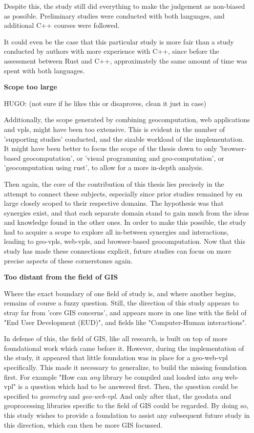 Despite this, the study still did everything to make the judgement as non-biased as possible.
Preliminary studies were conducted with both languages, and additional C++ courses were followed. 

It could even be the case that this particular study is more fair than a study conducted by authors with more experience with C++, 
since before the assessment between Rust and C++, approximately the same amount of time was spent with both languages. 

\textbf{Scope too large}

\begin{note}
  HUGO: (not sure if he likes this or disaproves, clean it just in case)
\end{note}

Additionally, the scope generated by combining geocomputation, web applications and vpls, might have been too extensive. 
This is evident in the number of 'supporting studies' conducted, and the sizable workload of the implementation.
It might have been better to focus the scope of the thesis down to only 'browser-based geocomputation', or 'visual programming and geo-computation', or 'geocomputation using rust', to allow for a more in-depth analysis.

Then again, the core of the contribution of this thesis lies precisely in the attempt to connect these subjects,
especially since prior studies remained by en large closely scoped to their respective domains.
The hypothesis was that synergies exist, and that each separate domain stand to gain much from the ideas and knowledge found in the other ones. 
In order to make this possible, the study had to acquire a scope to explore all in-between synergies and interactions, leading to geo-vpls, web-vpls, and browser-based geocomputation. 
Now that this study has made these connections explicit, future studies can focus on more precise aspects of these cornerstones again.

\textbf{Too distant from the field of GIS}

Where the exact boundary of one field of study is, and where another begins, remains of course a fuzzy question. 
Still, the direction of this study appears to stray far from 'core GIS concerns', and appears more in one line with the  field of "End User Development (EUD)", and fields like "Computer-Human interactions". 

In defense of this, the field of GIS, like all research, is built on top of more foundational work which came before it. 
However, during the implementation of the study, it appeared that little foundation was in place for a geo-web-vpl specifically. 
This made it necessary to generalize, to build the missing foundation first.
For example "How can \emph{any} library be compiled and loaded into \emph{any} web-vpl" is a question which had to be answered first. 
Then, the question could be specified to \emph{geometry} and \emph{geo-web-vpl}. 
And only after that, the geodata and geoprocessing libraries specific to the field of GIS could be regarded. 
By doing so, this study wishes to provide a foundation to assist any subsequent future study in this direction, which can then be more GIS focussed.

